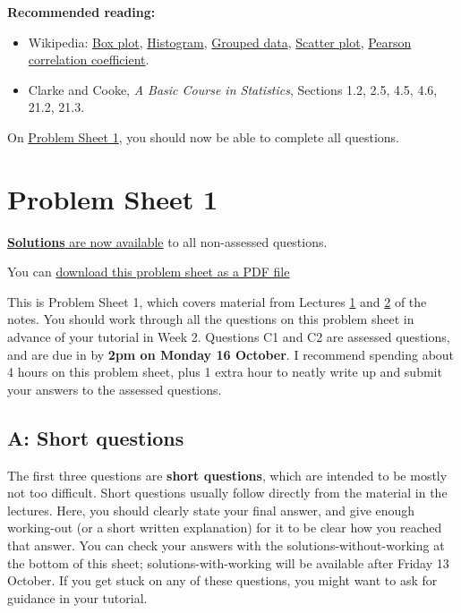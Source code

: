 \documentclass[
  a4paper,
]{book}
\providecommand{\tightlist}{%
  \setlength{\itemsep}{0pt}\setlength{\parskip}{0pt}}
\newif\ifcomm\commtrue
\theoremstyle{definition}
\theoremstyle{definition}
\theoremstyle{definition}
\theoremstyle{definition}
\theoremstyle{remark}
\begin{document}
\textbf{Recommended reading:}

\begin{itemize}
\tightlist
\item
  Wikipedia: \href{https://en.wikipedia.org/wiki/Box_plot}{Box plot}, \href{https://en.wikipedia.org/wiki/Histogram}{Histogram}, \href{https://en.wikipedia.org/wiki/Grouped_data}{Grouped data}, \href{https://en.wikipedia.org/wiki/Scatter_plot}{Scatter plot}, \href{https://en.wikipedia.org/wiki/Pearson_correlation_coefficient}{Pearson correlation coefficient}.
\item
  Clarke and Cooke, \emph{A Basic Course in Statistics}, Sections 1.2, 2.5, 4.5, 4.6, 21.2, 21.3.
\end{itemize}

On \protect\hyperlink{P1}{Problem Sheet 1}, you should now be able to complete all questions.

\hypertarget{P1}{%
\chapter*{Problem Sheet 1}\label{P1}}

\commfalse

\protect\hyperlink{P1-solutions}{\textbf{Solutions} are now available} to all non-assessed questions.

You can \href{P1-sheet.pdf}{download this problem sheet as a PDF file}

This is Problem Sheet 1, which covers material from Lectures \protect\hyperlink{L01-stats}{1} and \protect\hyperlink{L02-dataviz}{2} of the notes. You should work through all the questions on this problem sheet in advance of your tutorial in Week 2. Questions C1 and C2 are assessed questions, and are due in by \textbf{2pm on Monday 16 October}. I recommend spending about 4 hours on this problem sheet, plus 1 extra hour to neatly write up and submit your answers to the assessed questions.

\hypertarget{P1-short}{%
\section*{A: Short questions}\label{P1-short}}

The first three questions are \textbf{short questions}, which are intended to be mostly not too difficult. Short questions usually follow directly from the material in the lectures. Here, you should clearly state your final answer, and give enough working-out (or a short written explanation) for it to be clear how you reached that answer. You can check your answers with the solutions-without-working at the bottom of this sheet; solutions-with-working will be available after Friday 13 October. If you get stuck on any of these questions, you might want to ask for guidance in your tutorial.
\end{document}
